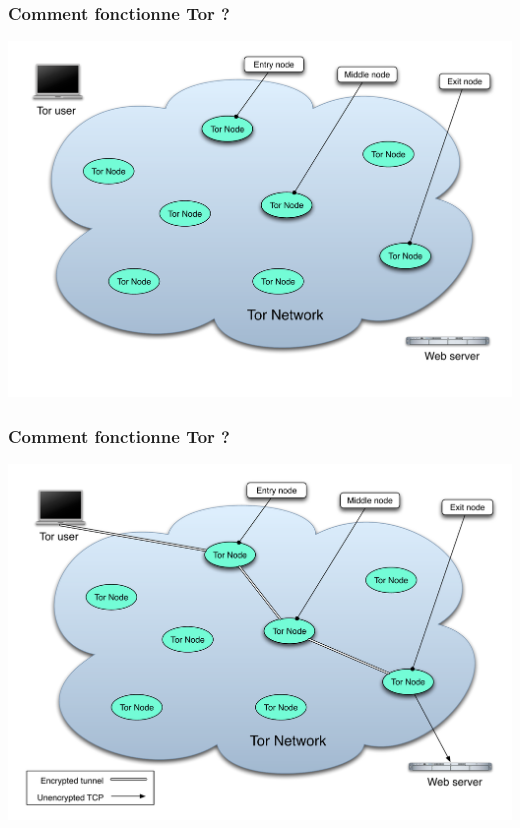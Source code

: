 \documentclass{beamer}
\begin{document}
\begin{frame}
\frametitle{Comment fonctionne Tor ?}
\begin{center}
\includegraphics[keepaspectratio,width=\textwidth, height=.8\textheight]{images/tor-safe-selection}
\end{center}
\end{frame}


\begin{frame}
\frametitle{Comment fonctionne Tor ?}
\begin{center}
\includegraphics[keepaspectratio,width=\textwidth, height=.8\textheight]{images/tor-safe-path}
\end{center}
\end{frame}
\end{document}
